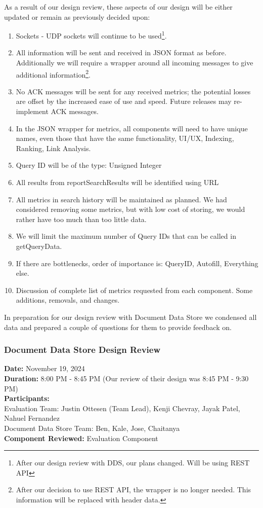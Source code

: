 \medskip

As a result of our design review, these aspects of our design will be either updated or remain as previously decided upon:
\begin{enumerate}
  \item Sockets - UDP sockets will continue to be used\footnote{After our design review with DDS, our plans changed. Will be using REST API}.
  \item All information will be sent and received in JSON format as before. Additionally we will require a wrapper around all incoming messages to give additional information\footnote{After our decision to use REST API, the wrapper is no longer needed. This information will be replaced with header data.}.
  \item No ACK messages will be sent for any received metrics; the potential losses are offset by the increased ease of use and speed. Future releases may re-implement ACK messages.
  \item In the JSON wrapper for metrics, all components will need to have unique names, even those that have the same functionality, UI/UX, Indexing, Ranking, Link Analysis.
  \item Query ID will be of the type: Unsigned Integer
  \item All results from reportSearchResults will be identified using URL
  \item All metrics in search history will be maintained as planned. We had considered removing some metrics, but with low cost of storing, we would rather have too much than too little data.
  \item We will limit the maximum number of Query IDs that can be called in getQueryData.
  \item If there are bottlenecks, order of importance is: QueryID, Autofill, Everything else.
  \item Discussion of complete list of metrics requested from each component. Some additions, removals, and changes.
\end{enumerate}
In preparation for our design review with Document Data Store we condensed all data and prepared a couple of questions for them to provide feedback on.

\newpage
\subsubsection*{Document Data Store Design Review}

\textbf{Date:} November 19, 2024 \\
\textbf{Duration:} 8:00 PM - 8:45 PM (Our review of their design was 8:45 PM - 9:30 PM)\\
\textbf{Participants:} \\
Evaluation Team: Justin Ottesen (Team Lead), Kenji Chevray, Jayak Patel, Nahuel Fernandez \\
Document Data Store Team: Ben, Kale, Jose, Chaitanya \\
\textbf{Component Reviewed:} Evaluation Component

